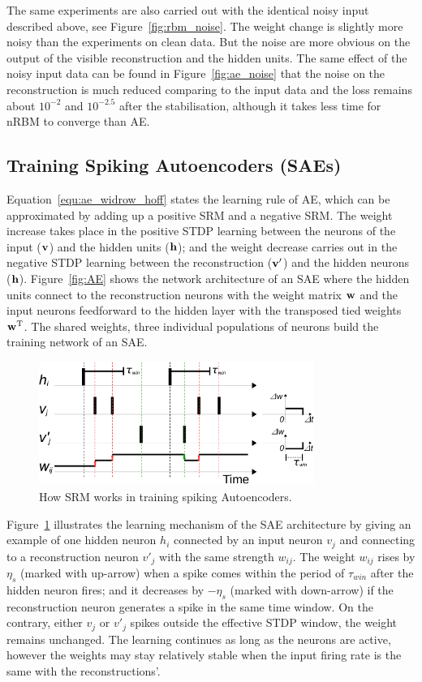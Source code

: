 The same experiments are also carried out with the identical noisy input described above, see Figure~\ref{fig:rbm_noise}.
The weight change is slightly more noisy than the experiments on clean data.
But the noise are more obvious on the output of the visible reconstruction and the hidden units.
The same effect of the noisy input data can be found in Figure~\ref{fig:ae_noise} that the noise on the reconstruction is much reduced comparing to the input data and the loss remains about $10^{-2}$ and $10^{-2.5}$ after the stabilisation, although it takes less time for nRBM to converge than AE.


\subsection{Training Spiking Autoencoders (SAEs)}
\label{subsec:SAE}
Equation~\ref{equ:ae_widrow_hoff} states the learning rule of AE, which can be approximated by adding up a positive SRM and a negative SRM.
The weight increase takes place in the positive STDP learning between the neurons of the input ($\bf{v}$) and the hidden units ($\bf{h}$); and the weight decrease carries out in the negative STDP learning between the reconstruction ($\bf{v'}$) and the hidden neurons ($\bf{h}$).
Figure~\ref{fig:AE} shows the network architecture of an SAE where the hidden units connect to the reconstruction neurons with the weight matrix $\bf{w}$ and the input neurons feedforward to the hidden layer with the transposed tied weights $\bf{w}^\textrm{T}$.
The shared weights, three individual populations of neurons build the training network of an SAE.

\begin{figure}
	\centering
	\includegraphics[width=0.8\textwidth]{pics_sdlm/rSTDP.pdf}
	\caption{How SRM works in training spiking Autoencoders.}
	\label{fig:rSTDP}
\end{figure}

Figure~\ref{fig:rSTDP} illustrates the learning mechanism of the SAE architecture by giving an example of one hidden neuron $h_i$ connected by an input neuron $v_j$ and connecting to a reconstruction neuron $v'_j$ with the same strength $w_{ij}$.
The weight $w_{ij}$ rises by $\eta_s$ (marked with up-arrow) when a spike comes within the period of $\tau_{win}$ after the hidden neuron fires;
and it decreases by $-\eta_s$ (marked with down-arrow) if the reconstruction neuron generates a spike in the same time window.
On the contrary, either $v_j$ or $v'_j$ spikes outside the effective STDP window, the weight remains unchanged.
The learning continues as long as the neurons are active, however the weights may stay relatively stable when the input firing rate is the same with the reconstructions'.

